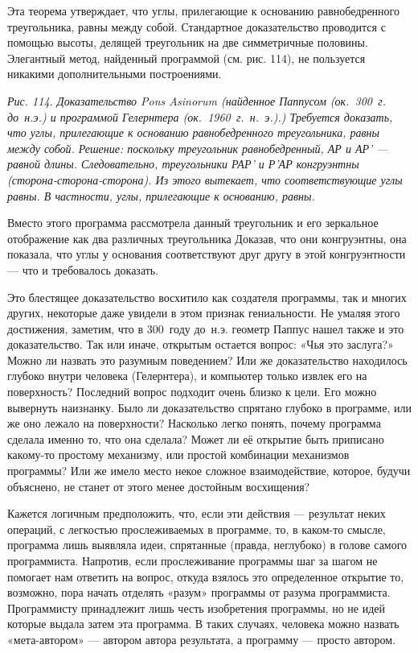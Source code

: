 \documentclass[../main.tex]{subfiles}
\begin{document}
Эта теорема утверждает, что углы, прилегающие к основанию равнобедренного треугольника, равны между собой. Стандартное доказательство проводится с помощью высоты, делящей треугольник на две симметричные половины. Элегантный метод, найденный программой (см. рис. 114), не пользуется никакими дополнительными построениями.

\emph{Рис. 114. Доказательство Pons Asinorum (найденное Паппусом (ок.~300~г. до~н.э.) и программой Гелернтера (ок.~1960~г.~н.~э.).) Требуется доказать, что углы, прилегающие к основанию равнобедренного треугольника, равны между собой. Решение: поскольку треугольник равнобедренный, АР и АР' --- равной длины. Следовательно, треугольники РАР' и Р'АР конгруэнтны (сторона-сторона-сторона). Из этого вытекает, что соответствующие углы равны. В частности, углы, прилегающие к основанию, равны.}

Вместо этого программа рассмотрела данный треугольник и его зеркальное отображение как два различных треугольника Доказав, что они конгруэнтны, она показала, что углы у основания соответствуют друг другу в этой конгруэнтности --- что и требовалось доказать.

Это блестящее доказательство восхитило как создателя программы, так и многих других, некоторые даже увидели в этом признак гениальности. Не умаляя этого достижения, заметим, что в 300~году до~н.э. геометр Паппус нашел также и это доказательство. Так или иначе, открытым остается вопрос: «Чья это заслуга?» Можно ли назвать это разумным поведением? Или же доказательство находилось глубоко внутри человека (Гелернтера), и компьютер только извлек его на поверхность? Последний вопрос подходит очень близко к цели. Его можно вывернуть наизнанку. Было ли доказательство спрятано глубоко в программе, или же оно лежало на поверхности? Насколько легко понять, почему программа сделала именно то, что она сделала? Может ли её открытие быть приписано какому-то простому механизму, или простой комбинации механизмов программы? Или же имело место некое сложное взаимодействие, которое, будучи объяснено, не станет от этого менее достойным восхищения?

Кажется логичным предположить, что, если эти действия --- результат неких операций, с легкостью прослеживаемых в программе, то, в каком-то смысле, программа лишь выявляла идеи, спрятанные (правда, неглубоко) в голове самого программиста. Напротив, если прослеживание программы шаг за шагом не помогает нам ответить на вопрос, откуда взялось это определенное открытие то, возможно, пора начать отделять «разум» программы от разума программиста. Программисту принадлежит лишь честь изобретения программы, но не идей которые выдала затем эта программа. В таких случаях, человека можно назвать «мета-автором» --- автором автора результата, а программу --- просто автором.
\end{document}

